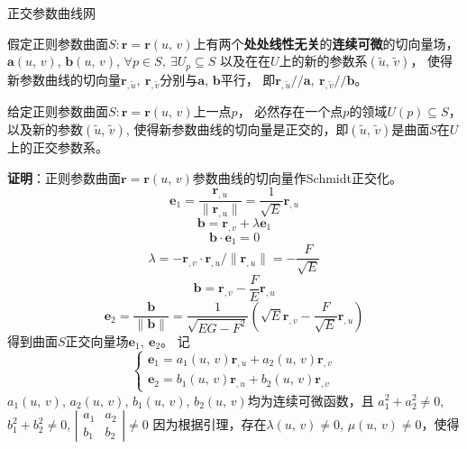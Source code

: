 正交参数曲线网

\begin{theorem}
    假定正则参数曲面$S:\mathbf{r}=\mathbf{r}\left(u,\, v\right)$上有两个\textbf{处处线性无关}的\textbf{连续可微}的切向量场，
    $\mathbf{a}\left(u,\,v\right)$, $\mathbf{b}\left(u,\,v\right)$, $\forall p\in S,\ \exists U_{p}\subseteq S$
    以及在在$U$上的新的参数系$\left(\tilde{u},\,\tilde{v}\right)$，
    使得新参数曲线的切向量$\mathbf{r}_{,\tilde{u}},\ \mathbf{r}_{,\tilde{v}}$分别与$\mathbf{a}$, $\mathbf{b}$平行，
    即$\mathbf{r}_{,\tilde{u}}//\mathbf{a},\ \mathbf{r}_{,\tilde{v}}//\mathbf{b}$。
\end{theorem}

\begin{theorem}
    给定正则参数曲面$S:\mathbf{r}=\mathbf{r}\left(u,\, v\right)$上一点$p$，
    必然存在一个点$p$的领域$U(p)\subseteq S$，以及新的参数$\left(\tilde{u},\,\tilde{v}\right)$,
    使得新参数曲线的切向量是正交的，即$\left(\tilde{u},\,\tilde{v}\right)$是曲面$S$在$U$上的正交参数系。
\end{theorem}
\textbf{证明}：正则参数曲面$\mathbf{r}=\mathbf{r}\left(u,\, v\right)$参数曲线的切向量作Schmidt正交化。
$$\mathbf{e}_{1}=\frac{\mathbf{r}_{,u}}{\|\mathbf{r}_{,u}\|}=\frac{1}{\sqrt{E}}\mathbf{r}_{,u}$$
$$\mathbf{b}=\mathbf{r}_{,v}+\lambda\mathbf{e}_{1}$$
$$\mathbf{b}\cdot\mathbf{e}_{1}=0$$
$$\lambda=-\mathbf{r}_{,v}\cdot\mathbf{r}_{,u}/\|\mathbf{r}_{,u}\|=-\frac{F}{\sqrt{E}}$$
$$\mathbf{b}=\mathbf{r}_{,v}-\frac{F}{E}\mathbf{r}_{,u}$$
$$\mathbf{e}_{2}=\frac{\mathbf{b}}{\|\mathbf{b}\|} = \frac{1}{\sqrt{EG-F^{2}}}\left(\sqrt{E}\mathbf{r}_{,v}-\frac{F}{\sqrt{E}}\mathbf{r}_{,u}\right)$$
得到曲面$S$正交向量场$\mathbf{e}_{1},\ \mathbf{e}_{2}$。
记
\begin{equation*}
    \left\{\begin{array}{l}
    \mathbf{e}_{1}=a_{1}(u,\,v)\mathbf{r}_{,u} + a_{2}(u,\,v)\mathbf{r}_{,v} \\
    \mathbf{e}_{2}=b_{1}(u,\,v)\mathbf{r}_{,u} + b_{2}(u,\,v)\mathbf{r}_{,v}
    \end{array}\right.
\end{equation*}
$a_{1}(u,\,v)$, $a_{2}(u,\,v)$, $b_{1}(u,\,v)$, $b_{2}(u,\,v)$均为连续可微函数，且
$a_{1}^{2}+a_{2}^{2}\neq 0$, $b_{1}^{2}+b_{2}^{2}\neq 0$,
$\left| \begin{array}{cc} a_{1} & a_{2} \\ b_{1} & b_{2} \end{array} \right|\neq 0$
因为根据引理，存在$\lambda(u,\,v)\neq 0$, $\mu(u,\, v)\neq 0$，使得
